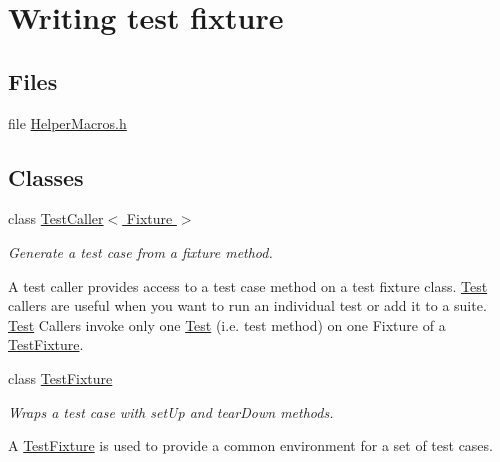 \hypertarget{group___writing_test_fixture}{\section{Writing test fixture}
\label{group___writing_test_fixture}
}
\subsection*{Files}
\begin{DoxyCompactItemize}
\item 
file \hyperlink{_helper_macros_8h}{Helper\-Macros.\-h}
\end{DoxyCompactItemize}
\subsection*{Classes}
\begin{DoxyCompactItemize}
\item 
class \hyperlink{class_test_caller}{Test\-Caller$<$ Fixture $>$}
\begin{DoxyCompactList}\small\item\em Generate a test case from a fixture method.

A test caller provides access to a test case method on a test fixture class. \hyperlink{class_test}{Test} callers are useful when you want to run an individual test or add it to a suite. \hyperlink{class_test}{Test} Callers invoke only one \hyperlink{class_test}{Test} (i.\-e. test method) on one Fixture of a \hyperlink{class_test_fixture}{Test\-Fixture}. \end{DoxyCompactList}\item 
class \hyperlink{class_test_fixture}{Test\-Fixture}
\begin{DoxyCompactList}\small\item\em Wraps a test case with set\-Up and tear\-Down methods.

A \hyperlink{class_test_fixture}{Test\-Fixture} is used to provide a common environment for a set of test cases. \end{DoxyCompactList}\end{DoxyCompactItemize}
